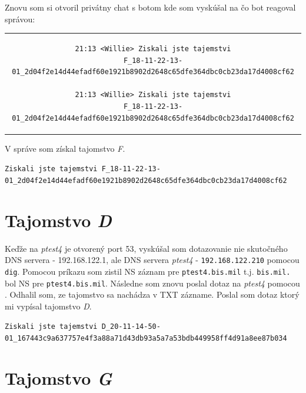 \documentclass[11pt,a4paper]{article}
\begin{document}
Znovu som si otvoril privátny chat s botom kde som vyskúšal  na čo bot reagoval správou:

\begin{center}
\begin{tabular}{c}
\begin{lstlisting}[basicstyle=\footnotesize]
21:13 <Willie> Ziskali jste tajemstvi
F_18-11-22-13-01_2d04f2e14d44efadf60e1921b8902d2648c65dfe364dbc0cb23da17d4008cf62

21:13 <Willie> Ziskali jste tajemstvi
F_18-11-22-13-01_2d04f2e14d44efadf60e1921b8902d2648c65dfe364dbc0cb23da17d4008cf62
\end{lstlisting}
\end{tabular}
\end{center}

V správe som získal tajomstvo \textit{F}.

\begin{center}
\small{\texttt{Ziskali jste tajemstvi F\_18-11-22-13-01\_2d04f2e14d44efadf60e1921b8902d2648c65dfe364dbc0cb23da17d4008cf62}}
\end{center}

\section{Tajomstvo \textit{D}}\label{sec:D}

Keďže na \textit{ptest4} je otvorený port 53, vyskúšal som dotazovanie nie skutočného DNS servera - 192.168.122.1, ale DNS servera \textit{ptest4} - \texttt{192.168.122.210} pomocou \texttt{dig}. Pomocou príkazu  som zistil NS záznam pre \texttt{ptest4.bis.mil} t.j. \texttt{bis.mil.} bol NS pre \texttt{ptest4.bis.mil}. Následne som znovu poslal dotaz na \textit{ptest4} pomocou . Odhalil som, ze tajomstvo sa nachádza v TXT zázname. Poslal som dotaz  ktorý mi vypísal tajomstvo \textit{D}.

\begin{center}
\small{\texttt{Ziskali jste tajemstvi D\_20-11-14-50-01\_167443c9a637757e4f3a88a71d43db93a5a7a53bdb449958ff4d91a8ee87b034}}
\end{center}

\section{Tajomstvo \textit{G}}\label{sec:G}
\end{document}

